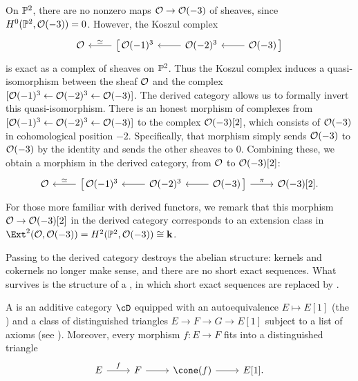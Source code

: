 \documentclass{amsart}
\begin{document}
\begin{example}\label{ex:roofPP2}
  On $\mathbb P^2$, there are no nonzero maps ${\mathcal O}\to{\mathcal O}(-3)$ of sheaves, since $H^0(\mathbb P^2,{\mathcal O}(-3)) = 0$.  However, the Koszul complex
\[\begin{tikzcd}
  \cO & {\bigl[\,\cO(-1)^3} & {\cO(-2)^3} & {\cO(-3)\,\bigr]}
  \arrow["\simeq"', from=1-2, to=1-1]
  \arrow[from=1-3, to=1-2]
  \arrow[from=1-4, to=1-3]
  \end{tikzcd}
  \]
  is exact as a complex of sheaves on $\mathbb P^2$.  Thus the Koszul complex induces a quasi-isomorphism between the sheaf ${\mathcal O}$ and the complex $[{\mathcal O}(-1)^3 \gets {\mathcal O}(-2)^3\gets {\mathcal O}(-3)]$.  The derived category allows us to formally invert this quasi-isomorphism. There is an honest morphism of complexes from $[{\mathcal O}(-1)^3 \gets {\mathcal O}(-2)^3\gets {\mathcal O}(-3)]$ to the complex ${\mathcal O}(-3)[2]$, which consists of ${\mathcal O}(-3)$ in cohomological position $-2$. Specifically, that morphism simply sends ${\mathcal O}(-3)$ to ${\mathcal O}(-3)$ by the identity and sends the other sheaves to $0$. Combining these, we obtain a morphism in the derived category, from ${\mathcal O}$ to ${\mathcal O}(-3)[2]$:
    \[\begin{tikzcd}
  \cO & {\bigl[\,\cO(-1)^3} & {\cO(-2)^3} & {\cO(-3)\,\bigr]} & {\cO(-3)[2]}.
  \arrow["\simeq"', from=1-2, to=1-1]
  \arrow[from=1-3, to=1-2]
  \arrow[from=1-4, to=1-3]
  \arrow["\pi", from=1-4, to=1-5]
  \end{tikzcd}\]
For those more familiar with derived functors, we remark that this morphism ${\mathcal O}\to {\mathcal O}(-3)[2]$ in the derived category corresponds to an extension class in 
$\Ext^2(\cO,\cO(-3))=\HH^2(\PP^2,\cO(-3))\cong\kk$.
\end{example}

Passing to the derived category destroys the abelian structure: kernels and cokernels no longer make sense, and there are no short exact sequences. What survives is the  structure of a , in which short exact sequences are replaced by .

\begin{defn}
  A  is an additive category $\cD$ equipped with an autoequivalence $E\mapsto E[1]$ (the ) and a class of distinguished triangles $E\to F\to G\to E[1]$ subject to a list of axioms (see \cite[\S1.2]{Huybrechts2006}). Moreover, every morphism $f\colon E\to F$ fits into a distinguished triangle
  \[\begin{tikzcd}
    E \rar{f} & F \rar & \cone(f) \rar & E[1].
  \end{tikzcd}\]
\end{defn}
\end{document}
